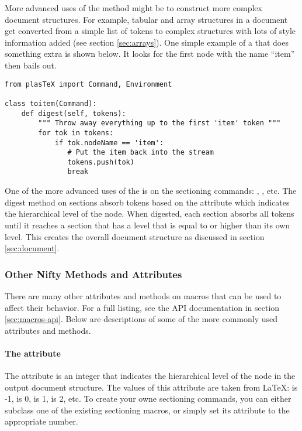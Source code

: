 More advanced uses of the  method might be to construct
more complex document structures.  For example, tabular and array
structures in a document get converted from a simple list of tokens
to complex structures with lots of style information added (see section
\ref{sec:arrays}).  One simple example of a  that
does something extra is shown below.  It looks for the first
node with the name ``item'' then bails out.
\begin{verbatim}
from plasTeX import Command, Environment

class toitem(Command):
    def digest(self, tokens):
        """ Throw away everything up to the first 'item' token """
        for tok in tokens:
            if tok.nodeName == 'item':
               # Put the item back into the stream
               tokens.push(tok)
               break
\end{verbatim}

One of the more advanced uses of the  is on the sectioning
commands: , , etc.  The digest method
on sections absorb tokens based on the  attribute which
indicates the hierarchical level of the node.  When digested, each section
absorbs all tokens until it reaches a section that has a level that is
equal to or higher than its own level.  This creates the overall
document structure as discussed in section \ref{sec:document}.


\subsubsection{Other Nifty Methods and Attributes}

There are many other attributes and methods on macros that can be used
to affect their behavior.  For a full listing, see the API documentation
in section \ref{sec:macros-api}.  Below are descriptions of some of the
more commonly used attributes and methods.

\paragraph{The  attribute}
The  attribute is an integer that indicates the
hierarchical level of the node in the output document structure.
The values of this attribute are taken from \LaTeX: 
is -1,  is 0,  is 1, 
is 2, etc.  To create your owne sectioning commands, you can either
subclass one of the existing sectioning macros, or simply set its
 attribute to the appropriate number.

